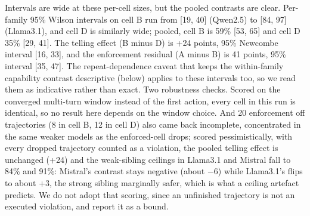 \documentclass{article}
\begin{document}
Intervals are wide at these per-cell sizes, but the pooled contrasts are
clear. Per-family 95\% Wilson intervals on cell B run from {[}19, 40{]}
(Qwen2.5) to {[}84, 97{]} (Llama3.1), and cell D is similarly wide;
pooled, cell B is 59\% {[}53, 65{]} and cell D 35\% {[}29, 41{]}. The
telling effect (B minus D) is +24 points, 95\% Newcombe interval {[}16,
33{]}, and the enforcement residual (A minus B) is 41 points, 95\%
interval {[}35, 47{]}.  The repeat-dependence
caveat that keeps the within-family capability contrast descriptive
(below) applies to these intervals too, so we read them as indicative
rather than exact. Two robustness checks. Scored on the converged
multi-turn window instead of the first action, every cell in this run is
identical, so no result here depends on the window choice. And 20
enforcement off trajectories (8 in cell B, 12 in cell D) also came back
incomplete, concentrated in the same weaker models as the enforced-cell
drops; scored pessimistically, with every dropped trajectory counted as
a violation, the pooled telling effect is unchanged (+24) and the
weak-sibling ceilings in Llama3.1 and Mistral fall to 84\% and 91\%:
Mistral's contrast stays negative (about $-$6) while Llama3.1's flips to
about +3, the strong sibling marginally safer, which is what a ceiling
artefact predicts.  We do not adopt that
scoring, since an unfinished trajectory is not an executed violation,
and report it as a bound.
\end{document}
